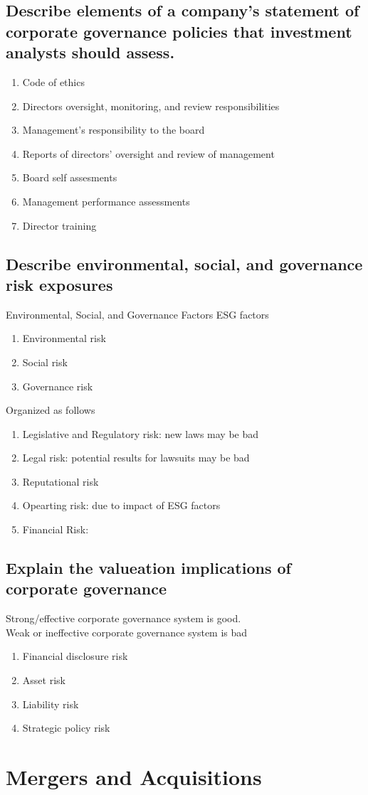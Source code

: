 \documentclass{article}
\newcommand{\be}{\begin{enumerate}}
\newcommand{\ee}{\end{enumerate}}
\begin{document}
\subsection{Describe elements of a company's statement of corporate governance
policies that investment analysts should assess.}
\be
    \item Code of ethics
    \item Directors oversight, monitoring, and review responsibilities
    \item Management's responsibility to the board
    \item Reports of directors' oversight and review of management
    \item Board self assesments
    \item Management performance assessments
    \item Director training
\ee
\subsection{Describe environmental, social, and governance risk exposures}
Environmental, Social, and Governance Factors
ESG factors
\be
    \item Environmental risk
    \item Social risk
    \item Governance risk
\ee
Organized as follows
\be
    \item Legislative and Regulatory risk: new laws may be bad
    \item Legal risk: potential results for lawsuits may be bad
    \item Reputational risk
    \item Opearting risk: due to impact of ESG factors
    \item Financial Risk:
\ee
\subsection{Explain the valueation implications of corporate governance}
Strong/effective corporate governance system is good.
\\Weak or ineffective corporate governance system is bad
\be
    \item Financial disclosure risk
    \item Asset risk
    \item Liability risk
    \item Strategic policy risk
\ee


\section{Mergers and Acquisitions}
\end{document}
